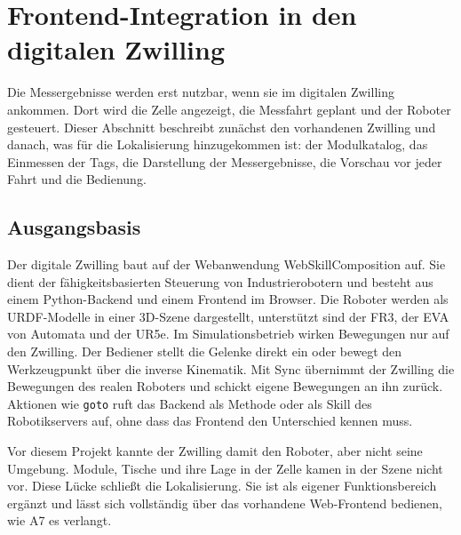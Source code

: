  \section{Frontend-Integration in den digitalen Zwilling}
 \label{sec:digitaler_zwilling}
Die Messergebnisse werden erst nutzbar, wenn sie im digitalen Zwilling ankommen. Dort wird die Zelle angezeigt, die Messfahrt geplant und der Roboter gesteuert. Dieser Abschnitt beschreibt zunächst den vorhandenen Zwilling und danach, was für die Lokalisierung hinzugekommen ist: der Modulkatalog, das Einmessen der Tags, die Darstellung der Messergebnisse, die Vorschau vor jeder Fahrt und die Bedienung.

\subsection{Ausgangsbasis}
\label{subsec:dz-basis}
Der digitale Zwilling baut auf der Webanwendung WebSkillComposition auf. Sie dient der fähigkeitsbasierten Steuerung von Industrierobotern und besteht aus einem Python-Backend und einem Frontend im Browser. Die Roboter werden als URDF-Modelle in einer 3D-Szene dargestellt, unterstützt sind der FR3, der EVA von Automata und der UR5e. Im Simulationsbetrieb wirken Bewegungen nur auf den Zwilling. Der Bediener stellt die Gelenke direkt ein oder bewegt den Werkzeugpunkt über die inverse Kinematik. Mit Sync übernimmt der Zwilling die Bewegungen des realen Roboters und schickt eigene Bewegungen an ihn zurück. Aktionen wie \texttt{goto} ruft das Backend als Methode oder als Skill des Robotikservers auf, ohne dass das Frontend den Unterschied kennen muss.

Vor diesem Projekt kannte der Zwilling damit den Roboter, aber nicht seine Umgebung. Module, Tische und ihre Lage in der Zelle kamen in der Szene nicht vor. Diese Lücke schließt die Lokalisierung. Sie ist als eigener Funktionsbereich ergänzt und lässt sich vollständig über das vorhandene Web-Frontend bedienen, wie A7 es verlangt.

